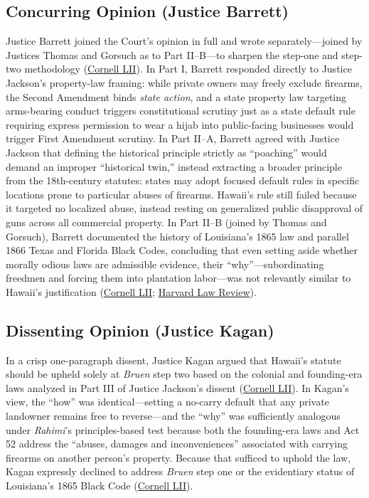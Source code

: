 \documentclass[12pt]{article}
\begin{document}
\subsection{Concurring Opinion (Justice Barrett)}
Justice Barrett joined the Court's opinion in full and wrote separately---joined by Justices Thomas and Gorsuch as to Part II--B---to sharpen the step-one and step-two methodology (\href{https://www.law.cornell.edu/supremecourt/text/24-1046}{Cornell LII}). In Part I, Barrett responded directly to Justice Jackson's property-law framing: while private owners may freely exclude firearms, the Second Amendment binds \textit{state action}, and a state property law targeting arms-bearing conduct triggers constitutional scrutiny just as a state default rule requiring express permission to wear a hijab into public-facing businesses would trigger First Amendment scrutiny. In Part II--A, Barrett agreed with Justice Jackson that defining the historical principle strictly as ``poaching'' would demand an improper ``historical twin,'' instead extracting a broader principle from the 18th-century statutes: states may adopt focused default rules in specific locations prone to particular abuses of firearms. Hawaii's rule still failed because it targeted no localized abuse, instead resting on generalized public disapproval of guns across all commercial property. In Part II--B (joined by Thomas and Gorsuch), Barrett documented the history of Louisiana's 1865 law and parallel 1866 Texas and Florida Black Codes, concluding that even setting aside whether morally odious laws are admissible evidence, their ``why''---subordinating freedmen and forcing them into plantation labor---was not relevantly similar to Hawaii's justification (\href{https://www.law.cornell.edu/supremecourt/text/24-1046}{Cornell LII}; \href{https://harvardlawreview.org/print/vol-140/wolford-v-lopez/}{Harvard Law Review}).

\subsection{Dissenting Opinion (Justice Kagan)}
In a crisp one-paragraph dissent, Justice Kagan argued that Hawaii's statute should be upheld solely at \textit{Bruen} step two based on the colonial and founding-era laws analyzed in Part III of Justice Jackson's dissent (\href{https://www.law.cornell.edu/supremecourt/text/24-1046}{Cornell LII}). In Kagan's view, the ``how'' was identical---setting a no-carry default that any private landowner remains free to reverse---and the ``why'' was sufficiently analogous under \textit{Rahimi}'s principles-based test because both the founding-era laws and Act 52 address the ``abuses, damages and inconveniences'' associated with carrying firearms on another person's property. Because that sufficed to uphold the law, Kagan expressly declined to address \textit{Bruen} step one or the evidentiary status of Louisiana's 1865 Black Code (\href{https://www.law.cornell.edu/supremecourt/text/24-1046}{Cornell LII}).
\end{document}
